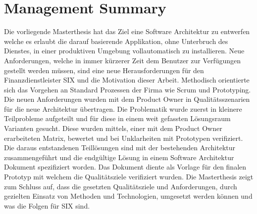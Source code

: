 \chapter{Management Summary}

Die vorliegende Masterthesis hat das Ziel eine Software Architektur zu entwerfen welche es erlaubt die darauf basierende Applikation, ohne Unterbruch des Dienstes, in einer produktiven Umgebung vollautomatisch zu installieren.\newline\newline
Neue Anforderungen, welche in immer kürzerer Zeit dem Benutzer zur Verfügungen gestellt werden müssen, sind eine neue Herausforderungen für den Finanzdienstleister SIX und die Motivation dieser Arbeit.\newline\newline
Methodisch orientierte sich das Vorgehen an Standard Prozessen der Firma wie Scrum und Prototyping. Die neuen Anforderungen wurden mit dem Product Owner in Qualitätsszenarien für die neue Architektur übertragen. Die Problematik wurde zuerst in kleinere Teilprobleme aufgeteilt und für diese in einem weit gefassten Lösungsraum Varianten gesucht. Diese wurden mittels, einer mit dem Product Owner erarbeiteten Matrix, bewertet und bei Unklarheiten mit Prototypen verifiziert. Die daraus entstandenen Teillösungen sind mit der bestehenden Architektur zusammengeführt und die endgültige Lösung in einem Software Architektur Dokument spezifiziert worden. Das Dokument diente als Vorlage für den finalen Prototyp mit welchem die Qualitätsziele verifiziert wurden.\newline\newline
Die Masterthesis zeigt zum Schluss auf, dass die gesetzten Qualitätsziele und Anforderungen, durch gezielten Einsatz von Methoden und Technologien, umgesetzt werden können und was die Folgen für SIX sind.
